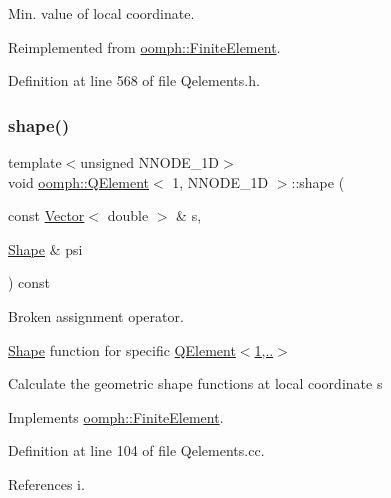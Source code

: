 Min. value of local coordinate. 



Reimplemented from \hyperlink{classoomph_1_1FiniteElement_a35f0803115b68bd162c07de04eeb6c5c}{oomph\+::\+Finite\+Element}.



Definition at line 568 of file Qelements.\+h.

\mbox{\label{classoomph_1_1QElement_3_011_00_01NNODE__1D_01_4_ab1b16e36bbe2cc83b566f1cad6b8c1d3}} 
\subsubsection{\texorpdfstring{shape()}{shape()}}
{\footnotesize\ttfamily template$<$unsigned N\+N\+O\+D\+E\+\_\+1D$>$ \\
void \hyperlink{classoomph_1_1QElement}{oomph\+::\+Q\+Element}$<$ 1, N\+N\+O\+D\+E\+\_\+1D $>$\+::shape (\begin{DoxyParamCaption}\item[{const \hyperlink{classoomph_1_1Vector}{Vector}$<$ double $>$ \&}]{s,  }\item[{\hyperlink{classoomph_1_1Shape}{Shape} \&}]{psi }\end{DoxyParamCaption}) const\hspace{0.3cm}{\ttfamily [virtual]}}



Broken assignment operator. 

\hyperlink{classoomph_1_1Shape}{Shape} function for specific \hyperlink{classoomph_1_1QElement_3_011_00_01NNODE__1D_01_4_a11fafdcbce81bce6c8420bb828afd448}{Q\+Element$<$1,..$>$}

Calculate the geometric shape functions at local coordinate s 

Implements \hyperlink{classoomph_1_1FiniteElement_a58a25b6859ddd43b7bfe64a19fee5023}{oomph\+::\+Finite\+Element}.



Definition at line 104 of file Qelements.\+cc.



References i.

\mbox{\label{classoomph_1_1QElement_3_011_00_01NNODE__1D_01_4_a0bc7e12731ff23a747a6a8ba5bdc712e}} 
